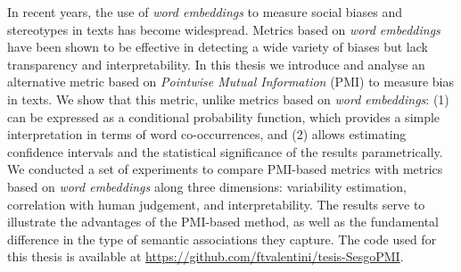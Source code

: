 In recent years, the use of \emph{word embeddings}  to measure social biases and stereotypes in texts has become widespread. Metrics based on \emph{word embeddings}  have been shown to be effective in detecting a wide variety of biases but lack transparency and interpretability. In this thesis we introduce and analyse an alternative metric based on \emph{Pointwise Mutual Information} (PMI) to measure bias in texts. We show that this metric, unlike metrics based on \emph{word embeddings}: (1) can be expressed as a conditional probability function, which provides a simple interpretation in terms of word co-occurrences, and (2) allows estimating confidence intervals and the statistical significance of the results parametrically. We conducted a set of experiments to compare PMI-based metrics with metrics based on \emph{word embeddings} along three dimensions: variability estimation, correlation with human judgement, and interpretability. The results serve to illustrate the advantages of the PMI-based method, as well as the fundamental difference in the type of semantic associations they capture. The code used for this thesis is available at \url{https://github.com/ftvalentini/tesis-SesgoPMI}.
